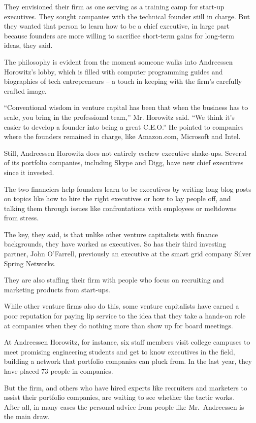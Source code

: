 ﻿\documentclass[12pt]{article}
\begin{document}
They envisioned their firm as one serving as a training camp for start-up executives. They sought
companies with the technical founder still in charge. But they wanted that person to learn how to be
a chief executive, in large part because founders are more willing to sacrifice short-term gains for
long-term ideas, they said.

The philosophy is evident from the moment someone walks into Andreessen Horowitz's lobby, which is
filled with computer programming guides and biographies of tech entrepreneurs -- a touch in keeping
with the firm's carefully crafted image.

``Conventional wisdom in venture capital has been that when the business has to scale, you bring in
the professional team,'' Mr. Horowitz said. ``We think it's easier to develop a founder into being a
great C.E.O.'' He pointed to companies where the founders remained in charge, like Amazon.com,
Microsoft and Intel.

Still, Andreessen Horowitz does not entirely eschew executive shake-ups. Several of its portfolio
companies, including Skype and Digg, have new chief executives since it invested.

The two financiers help founders learn to be executives by writing long blog posts on topics like
how to hire the right executives or how to lay people off, and talking them through issues like
confrontations with employees or meltdowns from stress.

The key, they said, is that unlike other venture capitalists with finance backgrounds, they have
worked as executives. So has their third investing partner, John O'Farrell, previously an executive
at the smart grid company Silver Spring Networks.

They are also staffing their firm with people who focus on recruiting and marketing products from
start-ups.

While other venture firms also do this, some venture capitalists have earned a poor reputation for
paying lip service to the idea that they take a hands-on role at companies when they do nothing more
than show up for board meetings.

At Andreessen Horowitz, for instance, six staff members visit college campuses to meet promising
engineering students and get to know executives in the field, building a network that portfolio
companies can pluck from. In the last year, they have placed 73 people in companies.

But the firm, and others who have hired experts like recruiters and marketers to assist their
portfolio companies, are waiting to see whether the tactic works. After all, in many cases the
personal advice from people like Mr.~Andreessen is the main draw.
\end{document}
